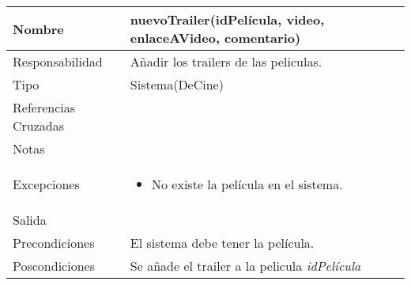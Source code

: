 \documentclass{article}
\begin{document}
\begin{table}[h]
\begin{tabular}{|l|l|l|l|l|l|}
\hline
\multicolumn{2}{|p{3cm}|}{Nombre} & \multicolumn{4}{p{10cm}|}{\textbf{nuevoTrailer(idPelícula, video, enlaceAVideo, comentario)}}\\
\hline
\multicolumn{2}{|p{3cm}|}{Responsabilidad} & \multicolumn{4}{p{10cm}|}{Añadir los trailers de las peliculas.} \\
\hline
\multicolumn{2}{|p{3cm}|}{Tipo} & \multicolumn{4}{p{10cm}|}{Sistema(DeCine)} \\
\hline
\multicolumn{2}{|p{3cm}|}{Referencias Cruzadas} & \multicolumn{4}{p{10cm}|}{} \\
\hline
\multicolumn{2}{|p{3cm}|}{Notas} & \multicolumn{4}{p{10cm}|}{} \\
\hline
\multicolumn{2}{|p{3cm}|}{Excepciones} & \multicolumn{4}{p{10cm}|}{\begin{itemize}
\item No existe la película en el sistema.
\end{itemize}} \\
\hline
\multicolumn{2}{|p{3cm}|}{Salida} & \multicolumn{4}{p{10cm}|}{} \\
\hline
\multicolumn{2}{|p{3cm}|}{Precondiciones} & \multicolumn{4}{p{10cm}|}{El sistema debe tener la película.} \\
\hline
\multicolumn{2}{|p{3cm}|}{Poscondiciones} & \multicolumn{4}{p{10cm}|}{Se añade el trailer a la pelicula \textit{idPelícula}} \\
\hline
\end{tabular}
\end{table}
\end{document}
